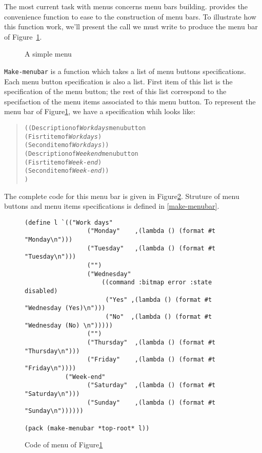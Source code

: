 The most current task with menus concerns menu bars
building. {\stklos} provides the convenience function 
to ease to the construction of menu bars. To illustrate how this
function work, we'll present the call we must write to produce the
menu bar of Figure~\ref{Menus}.
\begin{figure}
\centerline{}
\caption{A simple menu}
\label{Menus}
\end{figure}
{\tt Make-menubar} is a function which takes a list of menu buttons
specifications. Each menu button specification is also a list.  First item
of this list is the specification of the menu button; the rest of this list
correspond to the specifaction of the menu items associated to this menu
button. To represent the menu bar of Figure\ref{Menus}, we have a
specification whih looks like:
\begin{quote}
\begin{alltt}
	((Description of {\it Work days} menu button
	     (Fisrt item of {\it Work days})
	     (Second item of {\it Work days}))
	 (Description of {\it Week end} menu button
	     (Fisrt item of {\it Week-end})
	     (Second item of {\it Week-end}))
	)
\end{alltt}
\end{quote}
The complete code for this menu bar is given in Figure\ref{Menus:code}.
Struture of menu buttons and menu items specifications is defined in
\ref{make-menubar}.
\begin{figure}
{\small
\begin{verbatim}
(define l `(("Work days" 
                 ("Monday"    ,(lambda () (format #t "Monday\n")))
                 ("Tuesday"   ,(lambda () (format #t "Tuesday\n")))
                 ("")
                 ("Wednesday"
                     ((command :bitmap error :state disabled)
                      ("Yes" ,(lambda () (format #t "Wednesday (Yes)\n")))
                      ("No"  ,(lambda () (format #t "Wednesday (No) \n")))))
                 ("")
                 ("Thursday"  ,(lambda () (format #t "Thursday\n")))
                 ("Friday"    ,(lambda () (format #t "Friday\n"))))
           ("Week-end"
                 ("Saturday"  ,(lambda () (format #t "Saturday\n")))
                 ("Sunday"    ,(lambda () (format #t "Sunday\n"))))))

(pack (make-menubar *top-root* l))
\end{verbatim}
}
\caption{Code of menu of Figure\ref{Menus}}
\label{Menus:code}
\end{figure}




